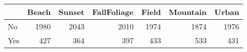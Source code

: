 \begin{tabular}{lrrrrrr}
\toprule
 & Beach & Sunset & FallFoliage & Field & Mountain & Urban \\
\midrule
No & 1980 & 2043 & 2010 & 1974 & 1874 & 1976 \\
Yes & 427 & 364 & 397 & 433 & 533 & 431 \\
\bottomrule
\end{tabular}
